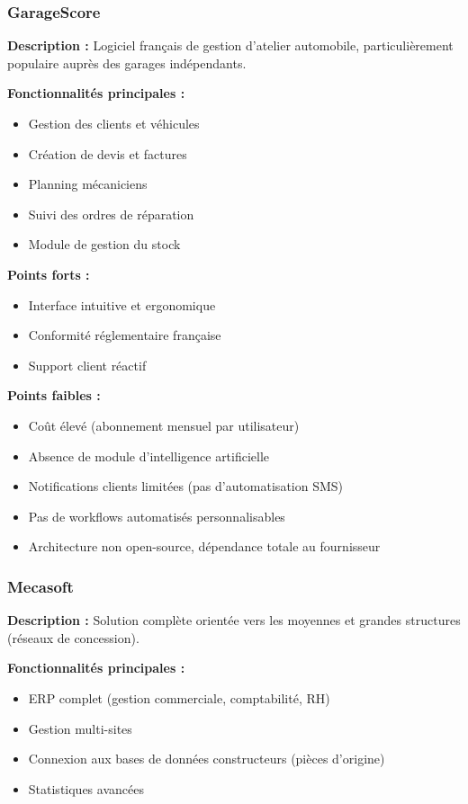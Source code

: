\subsubsection{GarageScore}

\textbf{Description :} Logiciel français de gestion d'atelier automobile, particulièrement populaire auprès des garages indépendants.

\textbf{Fonctionnalités principales :}
\begin{itemize}
    \item Gestion des clients et véhicules
    \item Création de devis et factures
    \item Planning mécaniciens
    \item Suivi des ordres de réparation
    \item Module de gestion du stock
\end{itemize}

\textbf{Points forts :}
\begin{itemize}
    \item Interface intuitive et ergonomique
    \item Conformité réglementaire française
    \item Support client réactif
\end{itemize}

\textbf{Points faibles :}
\begin{itemize}
    \item Coût élevé (abonnement mensuel par utilisateur)
    \item Absence de module d'intelligence artificielle
    \item Notifications clients limitées (pas d'automatisation SMS)
    \item Pas de workflows automatisés personnalisables
    \item Architecture non open-source, dépendance totale au fournisseur
\end{itemize}

\subsubsection{Mecasoft}

\textbf{Description :} Solution complète orientée vers les moyennes et grandes structures (réseaux de concession).

\textbf{Fonctionnalités principales :}
\begin{itemize}
    \item ERP complet (gestion commerciale, comptabilité, RH)
    \item Gestion multi-sites
    \item Connexion aux bases de données constructeurs (pièces d'origine)
    \item Statistiques avancées
\end{itemize}

